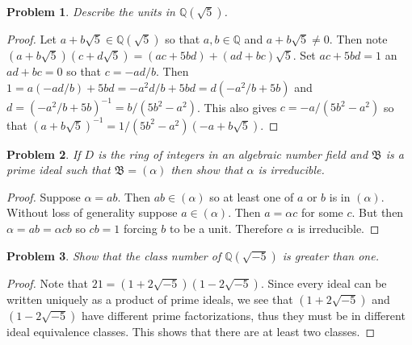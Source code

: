 \documentclass{article}
\newtheorem{problem}{Problem}
\begin{document}
\begin{problem}
Describe the units in $\mathbb{Q}(\sqrt{5})$.
\end{problem}
\begin{proof}
Let $a + b \sqrt{5} \in \mathbb{Q}(\sqrt{5})$ so that $a,b \in \mathbb{Q}$ and $a + b \sqrt{5} \neq 0$. Then note $(a + b\sqrt{5})(c + d\sqrt{5}) = (ac + 5bd) + (ad + bc)\sqrt{5}$. Set $ac+5bd = 1$ an $ad + bc = 0$ so that $c = -ad/b$. Then $1 = a(-ad/b) + 5bd = -a^2d/b + 5bd = d(-a^2/b + 5b)$ and $d = (-a^2/b+5b)^{-1} = b/(5b^2-a^2)$. This also gives $c = -a/(5b^2-a^2)$ so that $(a+b\sqrt{5})^{-1} = 1/(5b^2-a^2)(-a + b\sqrt{5})$.
\end{proof}

\begin{problem}
If $D$ is the ring of integers in an algebraic number field and $\mathfrak{B}$ is a prime ideal such that $\mathfrak{B} = (\alpha)$ then show that $\alpha$ is irreducible.
\end{problem}
\begin{proof}
Suppose $\alpha = ab$. Then $ab \in (\alpha)$ so at least one of $a$ or $b$ is in $(\alpha)$. Without loss of generality suppose $a \in (\alpha)$. Then $a = \alpha c$ for some $c$. But then $\alpha = ab = \alpha c b$ so $cb = 1$ forcing $b$ to be a unit. Therefore $\alpha$ is irreducible.
\end{proof}

\begin{problem}
Show that the class number of $\mathbb{Q}(\sqrt{-5})$ is greater than one.
\end{problem}
\begin{proof}
Note that $21 = (1 + 2 \sqrt{-5})(1 - 2 \sqrt{-5})$. Since every ideal can be written uniquely as a product of prime ideals, we see that $(1 + 2 \sqrt{-5})$ and $(1 - 2 \sqrt{-5})$ have different prime factorizations, thus they must be in different ideal equivalence classes. This shows that there are at least two classes.
\end{proof}
\end{document}
